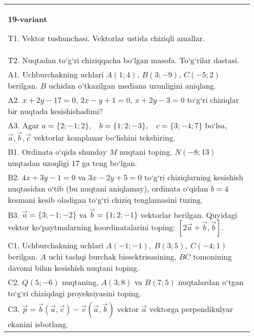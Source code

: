 \documentclass{article}
\begin{document}
\begin{tabular}{m{17cm}}
\textbf{19-variant}
\newline

T1. 
Vektor tushunchasi. Vektorlar ustida chiziqli amallar.
 \\
T2. 
Nuqtadan to‘g‘ri chiziqqacha bo‘lgan masofa. To‘g‘rilar dastasi.
 \\
A1. 
Uchburchakning uchlari $A (1;4) $, $B (3;-9) $, $C (-5;2) $
berilgan. $B$ uchidan o‘tkazilgan mediana uzunligini aniqlang.
 \\
A2. 
$x+2y-17=0$, $2x-y+1=0$, $x+2y-3=0$
to‘g‘ri chiziqlar bir nuqtada kesishishadimi?
 \\
A3. 
Agar \(a = \{ 2; - 1;2\}, \ \ \ \ b = \{ 1;2; - 3\}, \ \ \ \ c = \{ 3; - 4;7\}\) bo‘lsa, $\overrightarrow{a}, \overrightarrow{b}, \overrightarrow{c}$ vektorlar komplanar bo‘lishini tekshiring. \\
B1. 
Ordinata o‘qida shunday $M$ nuqtani toping.
\(N (-8;13) \) nuqtadan uzoqligi 17 ga teng bo‘lgan.
 \\
B2. 
\(4x+3y-1=0\) va \(3x-2y+5=0\)
to‘g‘ri chiziqlarning kesishish nuqtasidan o‘tib (bu nuqtani aniqlamay), ordinata
o‘qidan \(b=4\) kesmani kesib oladigan to‘g‘ri chiziq tenglamasini tuzing.
 \\
B3. 
$\vec{a} = \{ 3; - 1; - 2\}$ va $\vec{b} = \{ 1;2; - 1\}$ vektorlar berilgan. Quyidagi vektor ko‘paytmalarning koordinatalarini toping:
$\left\lbrack 2\vec{a} + \vec{b},\vec{b} \right\rbrack$.
 \\
C1. 
Uchburchakning uchlari
\(A (- 1; - 1),\ B (3;5),\ C (- 4;1) \) berilgan. $A$ uchi tashqi
burchak bissektrisasining, $BC$ tomonining davomi bilan kesishish
nuqtani toping.
 \\
C2. 
\(Q (5; - 6) \) nuqtaning, \(A (3;8) \) va \(B (7;5) \)
nuqtalardan o‘tgan to‘g‘ri chiziqdagi proyeksiyasini toping.
 \\
C3. 
\(\vec{p} = \vec{b} (\vec{a},\vec{c}) - \vec{c} (\vec{a},\vec{b}) \) vektor \(\vec{a}\) vektorga perpendikulyar ekanini isbotlang.
 \\

\end{tabular}
\vspace{1cm}
\end{document}
